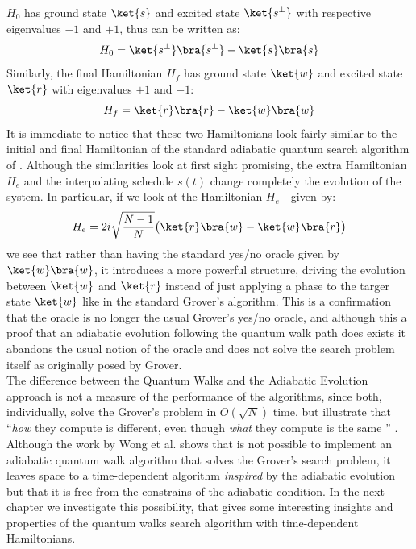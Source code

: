 $H_0$ has ground state $\ket{s}$ and excited state $\ket{s^\perp}$ with respective eigenvalues $-1$ and $+1$, thus can be written as:
\begin{equation}
  H_0  = \ket{s^\perp}\bra{s^\perp} - \ket{s}\bra{s}
\end{equation}
Similarly, the final Hamiltonian $H_f$ has ground state $\ket{w}$ and excited state $\ket{r}$ with eigenvalues $+1$ and $-1$:
\begin{equation}
  H_f =  \ket{r}\bra{r} - \ket{w}\bra{w}
\end{equation}
It is immediate to notice that these two Hamiltonians look fairly similar to the initial and final Hamiltonian of the standard adiabatic quantum search algorithm of . Although the similarities look at first sight promising, the extra Hamiltonian $H_e$ and the interpolating schedule $s(t)$ change completely the evolution of the system. In particular, if we look at the Hamiltonian $H_e$ - given by:
\begin{equation}
  H_e = 2i\sqrt{\frac{N-1}{N}}\big(\ket{r}\bra{w} - \ket{w}\bra{r}\big)
\end{equation}
we see that rather than having the standard yes/no oracle given by $\ket{w}\bra{w}$, it introduces a more powerful structure, driving the evolution between $\ket{w}$ and $\ket{r}$ instead of just applying a phase to the targer state $\ket{w}$ like in the standard Grover's algorithm. This is a confirmation that the oracle is no longer the usual Grover's yes/no oracle, and although this a proof that an adiabatic evolution following the quantum walk path does exists it abandons the usual notion of the oracle and does not solve the search problem itself as originally posed by Grover. \\

\noindent
The difference between the Quantum Walks and the Adiabatic Evolution approach is not a measure of the performance of the algorithms, since both, individually, solve the Grover's problem in $O(\sqrt{N})$ time, but illustrate that ``\textit{how} they compute is different, even though \textit{what} they compute is the same '' \cite{Wong2016}.\\

\noindent
Although the work by Wong et al. shows that is not possible to implement an adiabatic quantum walk algorithm that solves the Grover's search problem, it leaves space to a time-dependent algorithm \textit{inspired} by the adiabatic evolution but that it is free from the constrains of the adiabatic condition. In the next chapter we investigate this possibility, that gives some interesting insights and properties of the quantum walks search algorithm with time-dependent Hamiltonians.
